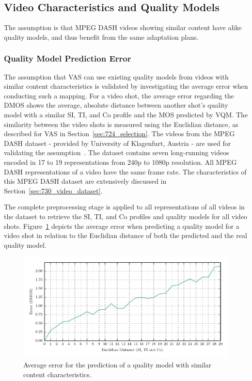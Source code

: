 \subsection{Video Characteristics and Quality Models}
The assumption is that \ac{MPEG} \ac{DASH} videos showing similar content have alike quality models, and thus benefit from the same adaptation plans.
\subsubsection{Quality Model Prediction Error}
\label{sec:724_quality_model_prediction_error}
The assumption that \ac{VAS} can use existing quality models from videos with similar content characteristics is validated by investigating the average error when conducting such a mapping.
For a video shot, the average error regarding the \ac{DMOS} shows the average, absolute distance between another shot's quality model with a similar \ac{SI}, \ac{TI}, and \ac{Co} profile and the \ac{MOS} predicted by \ac{VQM}.
The similarity between the video shots is measured using the Euclidian distance, as described for \ac{VAS} in Section~\ref{sec:724_selection}. 
The videos from the \ac{MPEG} \ac{DASH} dataset - provided by University of Klagenfurt, Austria - are used for validating the assumption~\cite{Lederer2012a,Lederer2013}.
The dataset contains seven long-running videos encoded in 17 to 19 representations from \ac{240p} to \ac{1080p} resolution.
All \ac{MPEG} \ac{DASH} representations of a video have the same frame rate.
The characteristics of this \ac{MPEG} \ac{DASH} dataset are extensively discussed in Section~\ref{sec:730_video_dataset}.

The complete preprocessing stage is applied to all representations of all videos in the dataset to retrieve the \ac{SI}, \ac{TI}, and \ac{Co} profiles and quality models for all video shots.
Figure~\ref{fig:plotvalidationoferroreucliddmos2all} depicts the average error when predicting a quality model for a video shot in relation to the Euclidian distance of both the predicted and the real quality model.
\begin{figure}[tbh]
\centering
\includegraphics{gfx/700_VAS/plotValidationOfErrorEUCLID_DMOS2_ALL}
\caption[Average errors in the prediction of quality models]{Average error for the prediction of a quality model with similar content characteristics.}
\label{fig:plotvalidationoferroreucliddmos2all}
\end{figure}

